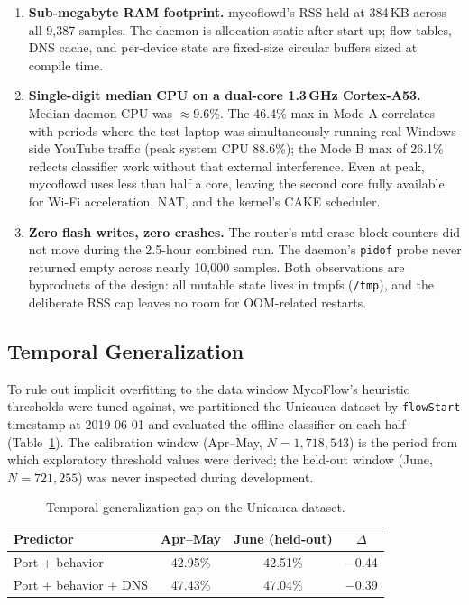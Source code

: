\documentclass[journal,onecolumn]{IEEEtran}
\begin{document}
\begin{enumerate}
\item \textbf{Sub-megabyte RAM footprint.} mycoflowd's RSS held at
384\,KB across all 9{,}387 samples. The daemon is allocation-static
after start-up; flow tables, DNS cache, and per-device state are
fixed-size circular buffers sized at compile time.

\item \textbf{Single-digit median CPU on a dual-core 1.3\,GHz Cortex-A53.}
Median daemon CPU was $\approx$9.6\%. The 46.4\% max in Mode A
correlates with periods where the test laptop was simultaneously
running real Windows-side YouTube traffic (peak system CPU 88.6\%);
the Mode B max of 26.1\% reflects classifier work without that
external interference. Even at peak, mycoflowd uses less than half a
core, leaving the second core fully available for Wi-Fi
acceleration, NAT, and the kernel's CAKE scheduler.

\item \textbf{Zero flash writes, zero crashes.} The router's mtd
erase-block counters did not move during the 2.5-hour combined run.
The daemon's \texttt{pidof} probe never returned empty across nearly
10{,}000 samples. Both observations are byproducts of the design:
all mutable state lives in tmpfs (\texttt{/tmp}), and the deliberate
RSS cap leaves no room for OOM-related restarts.
\end{enumerate}

\subsection{Temporal Generalization}
\label{sec:eval-temporal}

To rule out implicit overfitting to the data window MycoFlow's heuristic
thresholds were tuned against, we partitioned the Unicauca dataset by
\texttt{flowStart} timestamp at 2019-06-01 and evaluated the offline
classifier on each half (Table~\ref{tab:temporal}). The calibration
window (Apr--May, $N=1{,}718{,}543$) is the period from which
exploratory threshold values were derived; the held-out window (June,
$N=721{,}255$) was never inspected during development.

\begin{table}[t]
\centering
\caption{Temporal generalization gap on the Unicauca dataset.}
\label{tab:temporal}
\begin{tabular}{l|cc|c}
\toprule
\textbf{Predictor} & \textbf{Apr--May} & \textbf{June (held-out)} & $\Delta$ \\
\midrule
Port + behavior      & 42.95\% & 42.51\% & $-$0.44 \\
Port + behavior + DNS& 47.43\% & 47.04\% & $-$0.39 \\
\bottomrule
\end{tabular}
\end{table}
\end{document}
